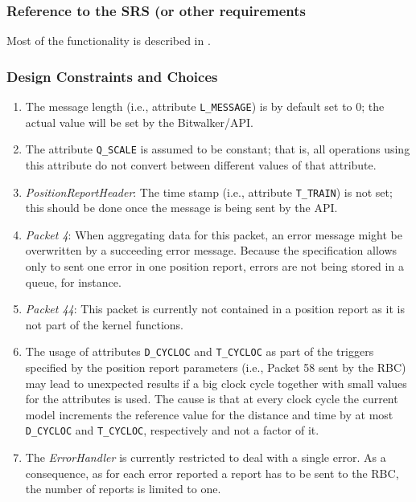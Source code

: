 \subsubsection{Reference to the SRS (or other requirements}
Most of the functionality is described in \cite[Chapter~3.6.5]{subset-026}.

\subsubsection{Design Constraints and Choices}
\begin{enumerate}
	\item The message length (i.e., attribute \verb+L_MESSAGE+) is by default set to 0; the actual value will be set by the Bitwalker/API.
	\item The attribute \verb+Q_SCALE+ is assumed to be constant; that is, all operations using this attribute do not convert between different values of that attribute.
	\item \textit{PositionReportHeader}: The time stamp (i.e., attribute \verb+T_TRAIN+) is not set; this should be done once the message is being sent by the API.
	\item \textit{Packet 4}: When aggregating data for this packet, an error message might be overwritten by a succeeding error message. Because the specification allows only to sent one error in one position report, errors are not being stored in a queue, for instance.
	\item \textit{Packet 44}: This packet is currently not contained in a position report as it is not part of the kernel functions.
	\item The usage of attributes \verb+D_CYCLOC+ and \verb+T_CYCLOC+ as part of the triggers specified by the position report parameters (i.e., Packet 58 sent by the RBC) may lead to unexpected results if a big clock cycle together with small values for the attributes is used. The cause is that at every clock cycle the current model increments the reference value for the distance and time by at most \verb+D_CYCLOC+ and \verb+T_CYCLOC+, respectively and not a factor of it.
	\item The \textit{ErrorHandler} is currently restricted to deal with a single error. As a consequence, as for each error reported a report has to be sent to the RBC, the number of reports is limited to one.
\end{enumerate}

